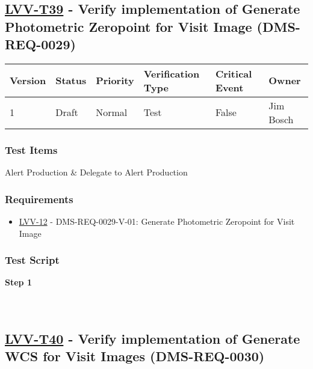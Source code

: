 \hypertarget{lvv-t39---verify-implementation-of-generate-photometric-zeropoint-for-visit-image-dms-req-0029}{%
\subsection{\texorpdfstring{\href{https://jira.lsstcorp.org/secure/Tests.jspa\#/testCase/LVV-T39}{LVV-T39}
- Verify implementation of Generate Photometric Zeropoint for Visit
Image
(DMS-REQ-0029)}{LVV-T39 - Verify implementation of Generate Photometric Zeropoint for Visit Image (DMS-REQ-0029)}}\label{lvv-t39---verify-implementation-of-generate-photometric-zeropoint-for-visit-image-dms-req-0029}}

\begin{longtable}[]{@{}llllll@{}}
\toprule
Version & Status & Priority & Verification Type & Critical Event &
Owner\tabularnewline
\midrule
\endhead
1 & Draft & Normal & Test & False & Jim Bosch\tabularnewline
\bottomrule
\end{longtable}

\hypertarget{test-items-15}{%
\subsubsection{Test Items}\label{test-items-15}}

Alert Production \& Delegate to Alert Production

\hypertarget{requirements-16}{%
\subsubsection{Requirements}\label{requirements-16}}

\begin{itemize}
\tightlist
\item
  \href{https://jira.lsstcorp.org/browse/LVV-12}{LVV-12} -
  DMS-REQ-0029-V-01: Generate Photometric Zeropoint for Visit Image
\end{itemize}

\hypertarget{test-script-16}{%
\subsubsection{Test Script}\label{test-script-16}}

\textbf{Step 1}\\
~\\
~\\

\hypertarget{lvv-t40---verify-implementation-of-generate-wcs-for-visit-images-dms-req-0030}{%
\subsection{\texorpdfstring{\href{https://jira.lsstcorp.org/secure/Tests.jspa\#/testCase/LVV-T40}{LVV-T40}
- Verify implementation of Generate WCS for Visit Images
(DMS-REQ-0030)}{LVV-T40 - Verify implementation of Generate WCS for Visit Images (DMS-REQ-0030)}}\label{lvv-t40---verify-implementation-of-generate-wcs-for-visit-images-dms-req-0030}}

